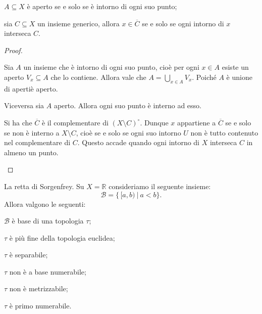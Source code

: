 \begin{prop}
	\begin{nlist}
		\item $A \subseteq X$ è aperto se e solo se è intorno di ogni suo punto;
		\item sia $C \subseteq X$ un insieme generico, allora $x \in
		\overline{C}$ se e solo se ogni intorno di $x$ interseca $C$.
	\end{nlist}
\end{prop}

\begin{proof}
    \begin{nlist}
        \item Sia $A$ un insieme che \`e intorno di ogni suo punto, cio\`e per
        ogni $x \in A$ esiste un aperto $V_x \subseteq A$ che lo contiene.
        Allora vale che $\displaystyle A = \bigcup_{x \in A} V_x$. Poiché $A$
        \`e unione di aperti\`e aperto.

        Viceversa sia $A$ aperto. Allora ogni suo punto \`e interno ad esso.

        \item Si ha che $\overline{C}$ \`e il complementare di $(X\setminus
        C)^\circ$. Dunque $x$ appartiene a $\overline{C}$ se e solo se non \`e
        interno a $X \setminus C$, cioè se e solo se ogni suo intorno $U$ non
        \`e tutto contenuto nel complementare di $C$. Questo accade quando ogni
        intorno di $X$ interseca $C$ in almeno un punto.
    \end{nlist}
\end{proof}

\begin{ex}
	La retta di Sorgenfrey. Su $X=\mathbb{R}$ consideriamo il seguente insieme:
	$${\mathcal{B}=\{\,[a, b)\ |\ a<b\}}.$$
    Allora valgono le seguenti:
	\begin{nlist}
		\item $\mathcal{B}$ è base di una topologia $\tau$;
		\item $\tau$ \`e pi\`u fine della topologia euclidea;
		\item $\tau$ è separabile;
		\item $\tau$ non è a base numerabile;
		\item $\tau$ non è metrizzabile;
		\item $\tau$ è primo numerabile.
	\end{nlist}
\end{ex}

